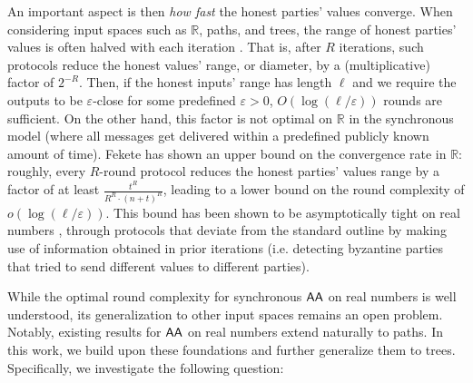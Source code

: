 An important aspect is then \emph{how fast} the honest parties' values converge. When considering input spaces such as $\mathbb{R}$, paths, and trees, the range of honest parties' values is often halved with each iteration \cite{JACM:DLPSW86, DISC:NoRy19}. That is, after $R$ iterations, such protocols reduce the honest values' range, or diameter, by a (multiplicative) factor of $2^{-R}$.
Then, if the honest inputs' range has length $\ell$ and we require the outputs to be $\varepsilon$-close for some predefined $\varepsilon > 0$, $O(\log (\ell / \varepsilon))$ rounds are sufficient. On the other hand, this factor is not optimal on $\mathbb{R}$ in the synchronous model (where all messages get delivered within a predefined publicly known amount of time). Fekete \cite{Fekete90} has shown an upper bound on the convergence rate in $\mathbb{R}$: roughly, every $R$-round protocol reduces the honest parties' values range by a factor of at least $\frac{t^R}{R^R \cdot (n + t)^R}$, leading to a lower bound on the round complexity of $o(\log (\ell / \varepsilon))$. This bound has been shown to be asymptotically tight on real numbers \cite{Fekete90,BenDoHo10,PODC:GhLiWa22}, through protocols that deviate from the standard outline by making use of information obtained in prior iterations (i.e. detecting byzantine parties that tried to send different values to different parties).

While the optimal round complexity for synchronous $\textsf{AA}$ on real numbers is well understood, its generalization to other input spaces remains an open problem. Notably, existing results for $\textsf{AA}$ on real numbers extend naturally to paths. In this work, we build upon these foundations and further generalize them to trees. Specifically, we investigate the following question:

\vspace{0.3cm}
\begin{center}
\end{center}
\vspace{0.3cm}


